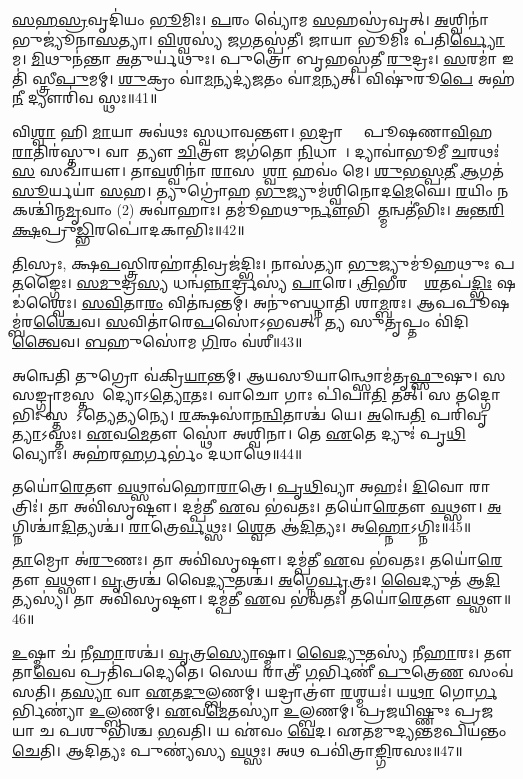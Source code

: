 \ul{𑌸}\ul{𑌹}\ul{𑌸𑍍𑌰}𑌵𑍃𑌦𑌿॑𑌯𑌂 \ul{𑌭𑍂}𑌮𑌿𑌃। \ul{𑌪}𑌰𑌂 𑌵𑍍𑌯𑍋॑𑌮 \ul{𑌸}𑌹𑌸𑍍𑌰॑𑌵𑍃𑌤𑍍‌। \ul{𑌅}𑌶𑍍𑌵𑌿𑌨𑌾॑ 𑌭𑍁𑌜𑍍𑌯𑍂॑𑌨𑌾\ul{𑌸}𑌤𑍍𑌯𑌾। 
\ul{𑌵𑌿}𑌶𑍍𑌵𑌸𑍍𑌯॑ 𑌜\ul{𑌗}𑌤𑌸𑍍𑌪॑𑌤𑍀। 𑌜𑌾𑌯𑌾 𑌭𑍂𑌮𑌿𑌃 𑌪॑𑌤𑌿\ul{𑌰𑍍𑌵𑍍𑌯𑍋}𑌮। \ul{𑌮𑌿}𑌥𑍁𑌨॑𑌨𑍍𑌤𑌾 \ul{𑌅}𑌤𑍁𑌰𑍍𑌯॑𑌥𑍁𑌃। 
𑌪𑍁𑌤𑍍𑌰𑍋 𑌬𑍃𑌹𑌸𑍍𑌪॑𑌤𑍀 \ul{𑌰𑍁}𑌦𑍍𑌰𑌃। \ul{𑌸}𑌰𑌮𑌾॑ 𑌇𑌤𑌿॑ 𑌸𑍍𑌤𑍍𑌰𑍀\ul{𑌪𑍁}𑌮𑌮𑍍‌। 
\ul{𑌶𑍁}𑌕𑍍𑌰𑌂 𑌵𑌾॑\ul{𑌮}𑌨𑍍𑌯𑌦𑍍𑌯॑\ul{𑌜}𑌤𑌂 𑌵𑌾॑\ul{𑌮}𑌨𑍍𑌯𑌤𑍍‌। 𑌵𑌿𑌷𑍁॑𑌰𑍂\ul{𑌪𑍇} 𑌅𑌹॑\ul{𑌨𑍀} 𑌦𑍍𑌯𑍗𑌰𑌿॑𑌵 𑌸𑍍𑌥𑌃॥41॥



𑌵𑌿\ul{𑌶𑍍𑌵𑌾} 𑌹𑌿 \ul{𑌮𑌾}𑌯𑌾 𑌅𑌵॑𑌥𑌃 𑌸𑍍𑌵𑌧𑌾𑌵𑌨𑍍𑌤𑍗। 
\ul{𑌭}𑌦𑍍𑌰𑌾 𑌵𑌾𑌂᳚ 𑌪𑍂𑌷𑌣𑌾\ul{𑌵𑌿}𑌹 \ul{𑌰𑌾}𑌤𑌿𑌰॑𑌸𑍍𑌤𑍁। 𑌵𑌾𑌸𑌾᳚𑌤𑍍𑌯𑍗 \ul{𑌚𑌿}𑌤𑍍𑌰𑍗 𑌜𑌗॑𑌤𑍋 \ul{𑌨𑌿}𑌧𑌾𑌨𑍗᳚। 
𑌦𑍍𑌯𑌾𑌵𑌾॑𑌭𑍂𑌮𑍀 \ul{𑌚}𑌰𑌥𑌃॑ \ul{𑌸}\ul{} 𑌸𑌖𑌾॑𑌯𑍗। 𑌤𑌾\ul{𑌵}𑌶𑍍𑌵𑌿𑌨𑌾॑ \ul{𑌰𑌾}𑌸𑌭𑌾᳚\ul{𑌶𑍍𑌵𑌾} 𑌹𑌵𑌂॑ 𑌮𑍇। 
\ul{𑌶𑍁}\ul{𑌭}\ul{𑌸𑍍𑌪}\ul{𑌤𑍀} \ul{𑌆}𑌗𑌤॑ \ul{𑌸𑍂}𑌰𑍍𑌯𑌯𑌾॑ \ul{𑌸}𑌹। 𑌤𑍍𑌯𑍁𑌗𑍍𑌰𑍋॑𑌹 \ul{𑌭𑍁}𑌜𑍍𑌯𑍁𑌮॑𑌶𑍍𑌵𑌿𑌨𑍋𑌦\ul{𑌮𑍇}𑌘𑍇। 
\ul{𑌰}𑌯𑌿𑌂 𑌨 𑌕𑌶𑍍𑌚𑌿॑𑌨𑍍𑌮\ul{𑌮𑍃}𑌵𑌾𑌂 (2) 𑌅𑌵𑌾॑𑌹𑌾𑌃। 𑌤𑌮𑍂॑𑌹𑌥𑍁\ul{𑌰𑍍𑌨𑍗}𑌭𑌿𑌰𑌾᳚\ul{𑌤𑍍𑌮}𑌨𑍍𑌵𑌤𑍀॑𑌭𑌿𑌃। 
\ul{𑌅}\ul{𑌨𑍍𑌤}\ul{𑌰𑌿}\ul{𑌕𑍍𑌷}𑌪𑍍𑌰𑍁\ul{𑌡𑍍𑌭𑌿}𑌰𑌪𑍋॑𑌦𑌕𑌾𑌭𑌿𑌃॥42॥


\ul{𑌤𑌿}𑌸𑍍𑌰𑌃, 𑌕𑍍𑌷\ul{𑌪}𑌸𑍍𑌤𑍍𑌰𑌿𑌰𑌹𑌾॑\ul{𑌤𑌿}𑌵𑍍𑌰𑌜॑𑌦𑍍𑌭𑌿𑌃। 𑌨𑌾𑌸॑𑌤𑍍𑌯𑌾 \ul{𑌭𑍁}𑌜𑍍𑌯𑍁𑌮𑍂॑𑌹𑌥𑍁𑌃 𑌪\ul{𑌤}𑌙𑍍𑌗𑍈𑌃। 
\ul{𑌸}\ul{𑌮𑍁}𑌦𑍍𑌰\ul{𑌸𑍍𑌯} 𑌧𑌨𑍍𑌵॑\ul{𑌨𑍍𑌨𑌾}𑌰𑍍𑌦𑍍𑌰𑌸𑍍𑌯॑ \ul{𑌪𑌾}𑌰𑍇। \ul{𑌤𑍍𑌰𑌿}𑌭𑍀𑌰𑌥𑍈𑌃᳚ \ul{𑌶}𑌤𑌪॑\ul{𑌦𑍍𑌭𑌿𑌃} 𑌷𑌡॑𑌶𑍍𑌵𑍈𑌃। 
\ul{𑌸}\ul{𑌵𑌿}𑌤𑌾\ul{𑌰𑌂} 𑌵𑌿𑌤॑𑌨𑍍𑌵𑌨𑍍𑌤𑌮𑍍‌। 𑌅𑌨𑍁॑𑌬𑌧𑍍𑌨𑌾𑌤𑌿 𑌶𑌾\ul{𑌮𑍍𑌬}𑌰𑌃। 𑌆𑌪𑌪𑍂\ur{}𑌷𑌮𑍍𑌬॑𑌰\ul{𑌶𑍍𑌚𑍈}𑌵। 
\ul{𑌸}𑌵𑌿𑌤𑌾॑𑌰𑍇\ul{𑌪}𑌸𑍋॑𑌽𑌭𑌵𑌤𑍍‌। 𑌤𑍍𑌯 𑌸𑍁𑌤𑍃𑌪𑍍𑌤𑌂 𑌵𑌿॑𑌦𑌿\ul{𑌤𑍍𑌵𑍈}𑌵। \ul{𑌬}𑌹𑍁𑌸𑍋॑𑌮 \ul{𑌗𑌿}𑌰𑌂 𑌵॑𑌶𑍀॥43॥

𑌅𑌨𑍍𑌵𑍇𑌤𑌿 𑌤𑍁𑌗𑍍𑌰𑍋 𑌵॑𑌕𑍍𑌰𑌿\ul{𑌯𑌾}𑌨𑍍𑌤𑌮𑍍‌। 𑌆𑌯𑌸𑍂𑌯𑌾𑌨𑍍𑌥𑍍𑌸𑍋𑌮॑𑌤𑍃\ul{𑌫𑍍𑌸𑍁}𑌷𑍁। 𑌸 \linebreak 𑌸𑌙𑍍𑌗𑍍𑌰𑌾𑌮𑌸𑍍𑌤𑌮𑍋᳚𑌦𑍍𑌯𑍋𑌽\ul{𑌤𑍍𑌯𑍋}𑌤𑌃। 
𑌵𑌾𑌚𑍋 𑌗𑌾𑌃 𑌪𑌿॑𑌪𑌾\ul{𑌤𑌿} 𑌤𑌤𑍍‌। 𑌸 𑌤𑌦𑍍𑌗𑍋𑌭𑌿𑌃 𑌸𑍍𑌤𑌵𑌾᳚𑌽𑌤𑍍𑌯𑍇\ul{𑌤𑍍𑌯}𑌨𑍍𑌯𑍇। \ul{𑌰}𑌕𑍍𑌷𑌸𑌾॑𑌨\ul{𑌨𑍍𑌵𑌿}𑌤𑌾𑌶𑍍𑌚॑ 𑌯𑍇। 
\ul{𑌅}𑌨𑍍𑌵𑍇\ul{𑌤𑌿} 𑌪𑌰𑌿॑𑌵𑍃\ul{𑌤𑍍𑌯𑌾}𑌽𑌸𑍍𑌤𑌃। \ul{𑌏}𑌵\ul{𑌮𑍇}𑌤𑍗 𑌸𑍍𑌥𑍋॑ 𑌅𑌶𑍍𑌵𑌿𑌨𑌾। 
𑌤𑍇 \ul{𑌏}𑌤𑍇 𑌦𑍍𑌯𑍁𑌃॑ 𑌪𑍃\ul{𑌥𑌿}𑌵𑍍𑌯𑍋𑌃। 𑌅𑌹॑𑌰\ul{𑌹}𑌰𑍍𑌗𑌰𑍍𑌭𑌂॑ 𑌦𑌧𑌾𑌥𑍇॥44॥

𑌤𑌯𑍋॑\ul{𑌰𑍇}𑌤𑍗 \ul{𑌵}𑌥𑍍𑌸𑌾𑌵॑𑌹𑍋\ul{𑌰𑌾}𑌤𑍍𑌰𑍇। \ul{𑌪𑍃}\ul{𑌥𑌿}𑌵𑍍𑌯𑌾 𑌅𑌹𑌃॑। \ul{𑌦𑌿}𑌵𑍋 𑌰𑌾𑌤𑍍𑌰𑌿𑌃॑। 
𑌤𑌾 𑌅𑌵𑌿॑𑌸𑍃𑌷𑍍𑌟𑍗। 𑌦𑌮𑍍𑌪॑𑌤𑍀 \ul{𑌏}𑌵 𑌭॑𑌵𑌤𑌃। 𑌤𑌯𑍋॑\ul{𑌰𑍇}𑌤𑍗 \ul{𑌵}𑌥𑍍𑌸𑍗। 
\ul{𑌅}𑌗𑍍𑌨𑌿𑌶𑍍𑌚𑌾॑\ul{𑌦𑌿}\ul{𑌤𑍍𑌯}𑌶𑍍𑌚॑। \ul{𑌰𑌾}𑌤𑍍𑌰𑍇\ul{𑌰𑍍𑌵}𑌥𑍍𑌸𑌃। \ul{𑌶𑍍𑌵𑍇}𑌤 𑌆॑\ul{𑌦𑌿}𑌤𑍍𑌯𑌃। 𑌅\ul{𑌹𑍍𑌨𑍋}𑌽𑌗𑍍𑌨𑌿𑌃॥45॥

\ul{𑌤𑌾}𑌮𑍍𑌰𑍋 𑌅॑\ul{𑌰𑍁}𑌣𑌃। 𑌤𑌾 𑌅𑌵𑌿॑𑌸𑍃𑌷𑍍𑌟𑍗। 𑌦𑌮𑍍𑌪॑𑌤𑍀 \ul{𑌏}𑌵 𑌭॑𑌵𑌤𑌃। 
𑌤𑌯𑍋॑\ul{𑌰𑍇}𑌤𑍗 \ul{𑌵}𑌥𑍍𑌸𑍗। \ul{𑌵𑍃}𑌤𑍍𑌰𑌶𑍍𑌚॑ 𑌵𑍈\ul{𑌦𑍍𑌯𑍁}𑌤𑌶𑍍𑌚॑। \ul{𑌅}𑌗𑍍𑌨𑍇\ul{𑌰𑍍𑌵𑍃}𑌤𑍍𑌰𑌃। \ul{𑌵𑍈}𑌦𑍍𑌯𑍁𑌤॑ 𑌆\ul{𑌦𑌿}𑌤𑍍𑌯𑌸𑍍𑌯॑। 
𑌤𑌾 𑌅𑌵𑌿॑𑌸𑍃𑌷𑍍𑌟𑍗। 𑌦𑌮𑍍𑌪॑𑌤𑍀 \ul{𑌏}𑌵 𑌭॑𑌵𑌤𑌃। 𑌤𑌯𑍋॑\ul{𑌰𑍇}𑌤𑍗 \ul{𑌵}𑌥𑍍𑌸𑍗॥46॥


\ul{𑌉}𑌷𑍍𑌮𑌾 𑌚॑ 𑌨𑍀\ul{𑌹𑌾}𑌰𑌶𑍍𑌚॑। \ul{𑌵𑍃}𑌤𑍍𑌰\ul{𑌸𑍍𑌯𑍋}𑌷𑍍𑌮𑌾। \ul{𑌵𑍈}\ul{𑌦𑍍𑌯𑍁}𑌤𑌸𑍍𑌯॑ 𑌨𑍀\ul{𑌹𑌾}𑌰𑌃। 
𑌤𑍗 𑌤𑌾\ul{𑌵𑍇}𑌵 𑌪𑍍𑌰𑌤𑌿॑𑌪𑌦𑍍𑌯𑍇𑌤𑍇। 𑌸𑍇𑌯 𑌰𑌾𑌤𑍍𑌰𑍀॑ \ul{𑌗}𑌰𑍍𑌭𑌿𑌣𑍀॑ \ul{𑌪𑍁}𑌤𑍍𑌰𑍇\ul{𑌣} 𑌸𑌂𑌵॑𑌸𑌤𑌿। 
𑌤\ul{𑌸𑍍𑌯𑌾} 𑌵𑌾 \ul{𑌏}𑌤\ul{𑌦𑍁}𑌲𑍍𑌬𑌣𑌮𑍍‌᳚। 𑌯𑌦𑍍𑌰𑌾𑌤𑍍𑌰𑍗॑ \ul{𑌰}𑌶𑍍𑌮𑌯𑌃॑। 
𑌯\ul{𑌥𑌾} 𑌗𑍋\ul{𑌰𑍍𑌗}𑌰𑍍𑌭𑌿𑌣𑍍𑌯𑌾॑ \ul{𑌉}𑌲𑍍𑌬𑌣𑌮𑍍‌᳚। \ul{𑌏}𑌵\ul{𑌮𑍇}𑌤𑌸𑍍𑌯𑌾॑ \ul{𑌉}𑌲𑍍𑌬𑌣𑌮𑍍‌᳚। 
𑌪𑍍𑌰𑌜𑌯𑌿𑌷𑍍𑌣𑍁𑌃 𑌪𑍍𑌰𑌜𑌯𑌾 𑌚 𑌪𑌶𑍁𑌭𑌿॑𑌶𑍍𑌚 \ul{𑌭}𑌵𑌤𑌿। 
𑌯 𑌏॑𑌵𑌂 \ul{𑌵𑍇}𑌦। 𑌏𑌤𑌮𑍁𑌦𑍍𑌯𑌨𑍍𑌤𑌮𑌪𑌿𑌯॑𑌨𑍍𑌤𑌂 \ul{𑌚𑍇}𑌤𑌿। 
𑌆𑌦𑌿𑌤𑍍𑌯𑌃 𑌪𑍁𑌣𑍍𑌯॑𑌸𑍍𑌯 \ul{𑌵}𑌥𑍍𑌸𑌃। 𑌅𑌥 𑌪𑌵𑌿॑𑌤𑍍𑌰𑌾\ul{𑌙𑍍𑌗𑌿}𑌰𑌸𑌃॥47॥\anuvakamend


